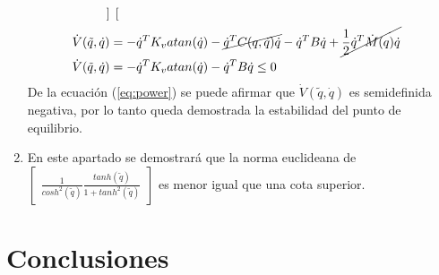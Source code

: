 \documentclass[12pt]{article}
\begin{document}
\begin{enumerate}
\begin{equation}
\begin{split}
{\begin{bmatrix}
            \end{bmatrix}}\\
            \dot{V}(\tilde{q},\dot{q})&=-\dot{q}^TK_vatan(\dot{q})-\cancel{\dot{q}^TC(q,\dot{q})\dot{q}}-\dot{q}^TB\dot{q}+\cancel{\frac{1}{2}\dot{q}^T\dot{M}(q)\dot{q}}\\
            \dot{V}(\tilde{q},\dot{q})&=-\dot{q}^TK_vatan(\dot{q})-\dot{q}^TB\dot{q}\leq 0\\
        \end{split}
        \label{eq:power}
    \end{equation}
    De la ecuación (\ref{eq:power}) se puede afirmar que $\dot{V}(\tilde{q},\dot{q})$ es semidefinida negativa, por lo tanto queda demostrada la estabilidad del punto de equilibrio.
    \item En este apartado se demostrará que la norma euclideana de $\begin{bmatrix}
        \frac{1}{cosh^2(\tilde{q})}\frac{tanh(\tilde{q})}{1+tanh^2(\tilde{q})}
    \end{bmatrix}$ es menor igual que una cota superior.
\end{enumerate}
\section{Conclusiones}


\end{document}
